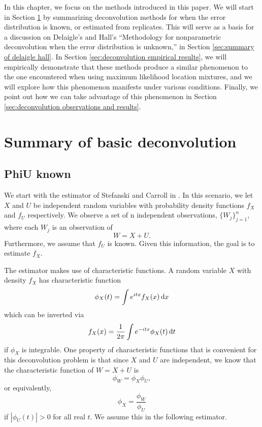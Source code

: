 
	In this chapter, we focus on the methods introduced in this paper. We will start in Section \ref{sec:summary of basic deconvolution} by summarizing deconvolution methods for when the error distribution is known, or estimated from replicates. This will serve as a basis for a discussion on Delaigle's and Hall's ``Methodology for nonparametric deconvolution when the error distribution is unknown,'' in Section \ref{sec:summary of delaigle hall}. In Section \ref{sec:deconvolution empirical results}, we will empirically demonstrate that these methods produce a similar phenomenon to the one encountered when using maximum likelihood location mixtures, and we will explore how this phenomenon manifests under various conditions. Finally, we point out how we can take advantage of this phenomenon in Section \ref{sec:deconvolution observations and results}.

\section{Summary of basic deconvolution}
\label{sec:summary of basic deconvolution}
\subsection{PhiU known}
	We start with the estimator of Stefanski and Carroll in \cite{Stefanski1990-uo}. In this scenario, we let $X$ and $U$ be independent random variables with probability density functions $f_X$ and $f_U$ respectively. We observe a set of n independent observations, $\{W_j\}_{j = 1}^n$, where each $W_j$ is an observation of 
	\begin{equation}
		W = X + U.
	\end{equation}
	Furthermore, we assume that $f_U$ is known. Given this information, the goal is to estimate $f_X$.

	The estimator makes use of characteristic functions. A random variable $X$ with density $f_X$ has characteristic function
	\begin{equation}
		\phi_X(t) = \int e^{i t x} f_X(x) \, \mathrm{d} x
	\end{equation}
	which can be inverted via
	\begin{equation}
		f_X(x) = \frac{1}{2\pi} \int e^{-itx} \phi_X(t) \, \mathrm{d} t
	\end{equation}
	if $\phi_X$ is integrable. One property of characteristic functions that is convenient for this deconvolution problem is that since $X$ and $U$ are independent, we know that the characteristic function of $W = X+ U$ is
	\begin{equation}
		\phi_W = \phi_X \phi_U,
	\end{equation}
	or equivalently,
	\begin{equation}
		\phi_X = \frac{\phi_W}{\phi_U}
	\end{equation}
	if $|\phi_U(t)| > 0$ for all real $t$. We assume this in the following estimator.

